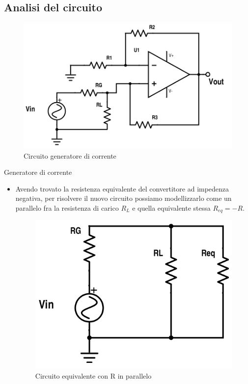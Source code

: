 \documentclass{beamer}
\begin{document}
\subsection{Analisi del circuito}

\begin{frame}

{
\centering
\begin{figure}
\centering
\includegraphics[width=1\linewidth]{./negative-impedance}
\caption{Circuito generatore di corrente}
\label{fig:negative-impedance}
\end{figure}

}
\end{frame}


\begin{frame}{Generatore di corrente}
\begin{itemize}
\item Avendo trovato la resistenza equivalente del convertitore ad impedenza negativa, per risolvere il nuovo circuito possiamo modellizzarlo come un parallelo fra la resistenza di carico $R_L$ e quella equivalente stessa $R_{eq} = -R$.

{
\centering
\begin{figure}
\centering
\includegraphics[width=0.6\linewidth]{./neg-resist-equiv}
\caption{Circuito equivalente con R in parallelo}
\label{fig:neg-resist-equiv}
\end{figure}



}


\end{itemize}
\end{frame}
\end{document}
